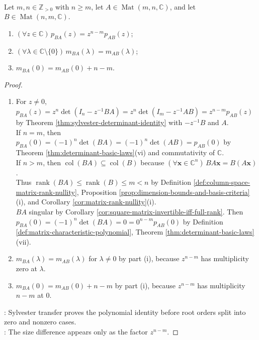 \begin{theorem} \label{thm:ab-ba-nonzero-eigenvalues} \\
Let $m,n\in\mathbb{Z}_{>0}$ with $n\geq m$, let $A\in\operatorname{Mat}(m,n,\mathbb{C})$, and let $B\in\operatorname{Mat}(n,m,\mathbb{C})$.
\begin{enumerate}[label=(\roman*)]
\setlength{\itemsep}{0pt}
\item $(\forall z\in\mathbb{C})\,p_{BA}(z)=z^{n-m}p_{AB}(z)$;
\item $(\forall\lambda\in\mathbb{C}\setminus\{0\})\,m_{BA}(\lambda)=m_{AB}(\lambda)$;
\item $m_{BA}(0)=m_{AB}(0)+n-m$.
\end{enumerate}
\begin{proof}
\begin{enumerate}[label=(\roman*)]
\setlength{\itemsep}{0pt}
\item For $z\neq0$, $p_{BA}(z)=z^n\det(I_n-z^{-1}BA)=z^n\det(I_m-z^{-1}AB)=z^{n-m}p_{AB}(z)$ by Theorem \ref{thm:sylvester-determinant-identity} with $-z^{-1}B$ and $A$.\\
If $n=m$, then $p_{BA}(0)=(-1)^n\det(BA)=(-1)^n\det(AB)=p_{AB}(0)$ by Theorem \ref{thm:determinant-basic-laws}(vi) and commutativity of $\mathbb{C}$.\\
If $n>m$, then $\operatorname{col}(BA)\subseteq\operatorname{col}(B)$ because $(\forall\mathbf{x}\in\mathbb{C}^n)\,BA\mathbf{x}=B(A\mathbf{x})$.\\
Thus $\operatorname{rank}(BA)\leq\operatorname{rank}(B)\leq m<n$ by Definition \ref{def:column-space-matrix-rank-nullity}, Proposition \ref{prop:dimension-bounds-and-basis-criteria}(i), and Corollary \ref{cor:matrix-rank-nullity}(i).\\
$BA$ singular by Corollary \ref{cor:square-matrix-invertible-iff-full-rank}. Then $p_{BA}(0)=(-1)^n\det(BA)=0=0^{n-m}p_{AB}(0)$ by Definition \ref{def:matrix-characteristic-polynomial}, Theorem \ref{thm:determinant-basic-laws}(vii).
\item $m_{BA}(\lambda)=m_{AB}(\lambda)$ for $\lambda\neq0$ by part (i), because $z^{n-m}$ has multiplicity zero at $\lambda$.
\item $m_{BA}(0)=m_{AB}(0)+n-m$ by part (i), because $z^{n-m}$ has multiplicity $n-m$ at $0$.
\end{enumerate}
: Sylvester transfer proves the polynomial identity before root orders split into zero and nonzero cases.\\
: The size difference appears only as the factor $z^{n-m}$.
\end{proof}
\end{theorem}

